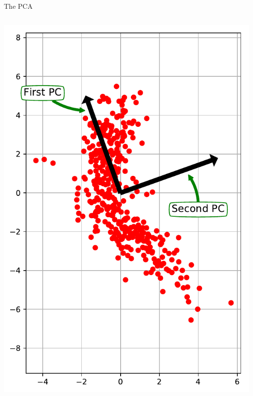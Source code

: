 \documentclass[10pt, aspectratio=169]{beamer} %
\begin{document}
\begin{frame}[fragile, allowframebreaks=0.8]{The PCA}
\begin{columns}
		\begin{center}
			\includegraphics[width=\columnwidth]{PCA_example.pdf}
		\end{center}
		\end{columns}
\end{frame}
\end{document}
